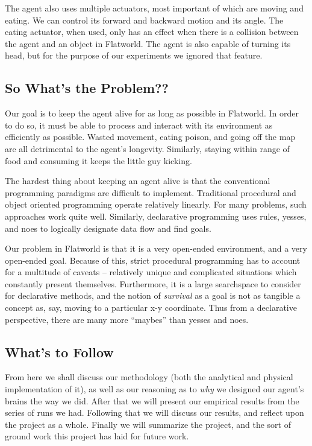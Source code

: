 The agent also uses multiple actuators, most important of which are moving 
and eating. We can control its forward and backward motion and its angle.
The eating actuator, when used, only has an effect when there is a collision
between the agent and an object in Flatworld. The agent is also capable of
turning its head, but for the purpose of our experiments we ignored that 
feature.


\subsection{So What's the Problem??}
Our goal is to keep the agent alive for as long as possible in Flatworld.
In order to do so, it must be able to process and interact with its environment
as efficiently as possible. Wasted movement, eating poison, and going off
the map are all detrimental to the agent's longevity. Similarly, staying
within range of food and consuming it keeps the little guy kicking.

The hardest thing about keeping an agent alive is that the conventional 
programming paradigms are difficult to implement. Traditional procedural and 
object oriented programming operate relatively linearly. For many problems, 
such approaches work quite well. Similarly, declarative programming uses rules, 
yesses, and noes to logically designate data flow and find goals.

Our problem in Flatworld is that it is a very open-ended environment, and a
very open-ended goal. Because of this, strict procedural programming has
to account for a multitude of caveats -- relatively unique and complicated
situations which constantly present themselves. Furthermore, it is a large 
searchspace to consider for declarative methods, and the notion of 
\emph{survival} as a goal is not as tangible a concept as, say, moving to a 
particular x-y coordinate. Thus from a declarative perspective, there are 
many more ``maybes'' than yesses and noes.


\subsection{What's to Follow}
From here we shall discuss our methodology (both the analytical and physical 
implementation of it), as well as our reasoning as to \emph{why} we designed
our agent's brains the way we did. After that we will present our empirical
results from the series of runs we had. Following that
we will discuss our results, and reflect upon the project as a whole. Finally
we will summarize the project, and the sort of ground work this project
has laid for future work.

